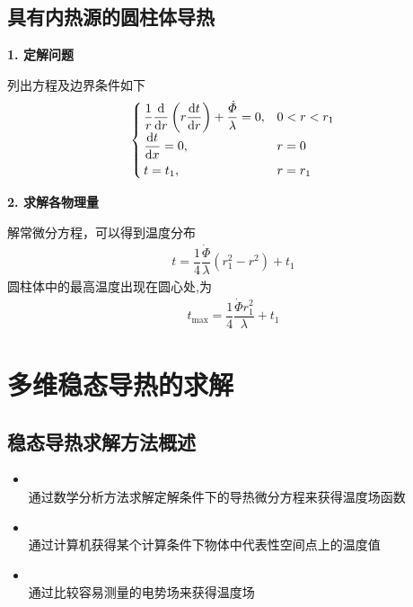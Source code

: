 \subsection{具有内热源的圆柱体导热}
\noindent \textbf{1. 定解问题}

列出方程及边界条件如下
\begin{align}
	\begin{cases}
		\, \dfrac{1}{r}\dfrac{{\rm{d}}}{{\rm{d}} r}\left(r \dfrac{{\rm{d}} t}{{\rm{d}} r}\right)+ \dfrac{\dot{\varPhi}}{\lambda} = 0, & 0< r < r_1 \\[0.5em]
		\, \dfrac{{\rm{d}} t}{{\rm{d}} x} = 0, & r = 0\\[0.5em]
		\, t = t_1, & r = r_1
	\end{cases}
\end{align}

\noindent \textbf{2. 求解各物理量}

解常微分方程，可以得到温度分布
	\begin{align}
		t = \dfrac{1}{4} \dfrac{\dot{\varPhi}}{\lambda}\left(r_1^2 - r^2\right)+ t_1
	\end{align}
圆柱体中的最高温度出现在圆心处,为
\begin{align}
	t_{\max} =  \dfrac{1}{4} \dfrac{\dot{\varPhi}r_1^2}{\lambda} + t_1
\end{align}






\section{多维稳态导热的求解}

\subsection{稳态导热求解方法概述}
\begin{itemize}
	\item {}
\\
	\hspace*{2em} 通过数学分析方法求解定解条件下的导热微分方程来获得温度场函数
\vspace*{-0.5em}
	
	\item {}
\\
	\hspace*{2em} 通过计算机获得某个计算条件下物体中代表性空间点上的温度值
\vspace*{-0.5em}
	
	\item {}
\\
	\hspace*{2em} 通过比较容易测量的电势场来获得温度场
\end{itemize}

